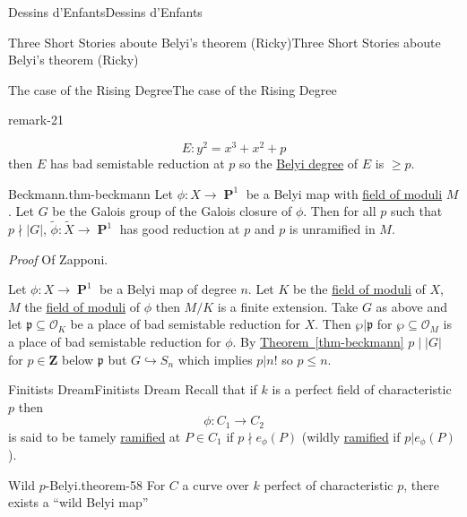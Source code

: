 \documentclass[10pt,]{book}
\makeatletter
\renewcommand*{\proofname}{Proof}
\renewenvironment{proof}[1][\proofname]{\par
  \pushQED{\qed}%
  \normalfont \topsep6\p@\@plus6\p@\relax
  \trivlist
  \item\relax
    {\itshape
    #1\@addpunct{.}}\hspace\labelsep\ignorespaces
}{%
  \popQED\endtrivlist\@endpefalse
}
\numberwithin{equation}{section}
\newcommand{\ideal}[1]{\mathfrak{#1}}
\newcommand{\ZZ}{\mathbf{Z}}
\newcommand{\ints}{\mathcal{O}}
\DeclareMathOperator{\PP}{\mathbf{P}}
\makeatother
\begin{document}
\begin{chapterptx}{Dessins d'Enfants}{}{Dessins d'Enfants}{}{}
\begin{sectionptx}{Three Short Stories aboute Belyi's theorem (Ricky)}{}{Three Short Stories aboute Belyi's theorem (Ricky)}{}{}
\begin{subsectionptx}{The case of the Rising Degree}{}{The case of the Rising Degree}{}{}
\begin{remark}{}{remark-21}
\begin{enumerate}
\begin{equation*}
E\colon y^2 = x^3 + x^2 + p
\end{equation*}
then \(E\) has bad semistable reduction at \(p\) so the \hyperref[def-belyi-degree]{Belyi degree} of \(E\) is \(\ge p\).%
\end{enumerate}
%
\end{remark}
\begin{theorem}{Beckmann.}{}{thm-beckmann}%
\hypertarget{p-745}{}%
Let \(\phi \colon X \to \PP^1\) be a Belyi map with \hyperref[def-field-of-moduli]{field of moduli} \(M\). Let \(G\) be the Galois group of the Galois closure of \(\phi\). Then for all \(p\) such that \(p \nmid |G|\), \(\tilde \phi \colon \tilde X \to \PP^1\) has good reduction at \(p\) and \(p\) is unramified in \(M\).%
\end{theorem}
\begin{proof}\hypertarget{proof-101}{}
\hypertarget{p-746}{}%
Of Zapponi.%
\par
\hypertarget{p-747}{}%
Let \(\phi\colon X \to \PP^1\) be a Belyi map of degree \(n\). Let \(K\) be the \hyperref[def-field-of-moduli]{field of moduli} of \(X\), \(M\) the \hyperref[def-field-of-moduli]{field of moduli} of \(\phi\) then \(M/K\) is a finite extension. Take \(G\) as above and let \(\ideal p \subseteq \ints_K\) be a place of bad semistable reduction for \(X\). Then \(\wp| \ideal p\) for \(\wp \subseteq \ints_M\) is a place of bad semistable reduction for \(\phi\). By \hyperref[thm-beckmann]{Theorem~\ref{thm-beckmann}} \(p \mid |G|\) for \(p\in \ZZ\) below \(\ideal p\) but \(G \hookrightarrow S_n\) which implies \(p|n!\) so \(p\le n\).%
\end{proof}
\end{subsectionptx}
%
%
\typeout{************************************************}
\typeout{************************************************}
%
\begin{subsectionptx}{Finitists Dream}{}{Finitists Dream}{}{}\label{subsection-65}
\hypertarget{p-748}{}%
Recall that if \(k \) is a perfect field of characteristic \(p\) then%
\begin{equation*}
\phi \colon C_1 \to C_2
\end{equation*}
is said to be tamely \hyperref[def-dess-ramified]{ramified} at \(P\in C_1\) if \(p\nmid e_\phi(P)\) (wildly \hyperref[def-dess-ramified]{ramified} if \(p |e_\phi(P)\)).%
\begin{theorem}{Wild \(p\)-Belyi.}{}{theorem-58}%
\hypertarget{p-749}{}%
For \(C\) a curve over \(k\) perfect of characteristic \(p\), there exists a ``wild Belyi map''%

\end{theorem}
\end{subsectionptx}
\end{sectionptx}
\end{chapterptx}
\end{document}
